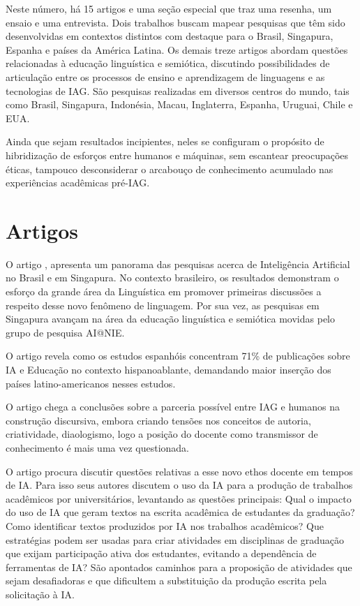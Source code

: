 \documentclass[portuguese]{textolivre}
\begin{document}
Neste número, há 15 artigos e uma seção especial que traz uma resenha, um ensaio e uma entrevista.  Dois trabalhos buscam mapear pesquisas que têm sido desenvolvidas em contextos distintos com destaque para o Brasil, Singapura, Espanha e países da América Latina. Os demais treze artigos abordam questões relacionadas à educação linguística e semiótica, discutindo possibilidades de articulação entre os processos de ensino e aprendizagem de linguagens e as tecnologias de IAG. São pesquisas realizadas em diversos centros do mundo, tais como Brasil, Singapura, Indonésia, Macau, Inglaterra, Espanha, Uruguai, Chile e EUA.

Ainda que sejam resultados incipientes, neles se configuram o propósito de hibridização de esforços entre humanos e máquinas, sem escantear preocupações éticas, tampouco desconsiderar o arcabouço de conhecimento acumulado nas experiências acadêmicas pré-IAG.

\section{Artigos}
  
O artigo , apresenta um panorama das pesquisas acerca de Inteligência Artificial no Brasil e em Singapura. No contexto brasileiro, os resultados demonstram o esforço da grande área da Linguística em promover primeiras discussões a respeito desse novo fenômeno de linguagem. Por sua vez, as pesquisas em Singapura avançam na área da educação linguística e semiótica movidas pelo grupo de pesquisa AI@NIE.

O artigo  revela como os estudos espanhóis concentram 71\% de publicações sobre IA e Educação no contexto hispanoablante, demandando maior inserção dos países latino-americanos nesses estudos.

O artigo  chega a conclusões sobre a parceria possível entre IAG e humanos na construção discursiva, embora criando tensões nos conceitos de autoria, criatividade, diaologismo, logo a posição do docente como transmissor de conhecimento é mais uma vez questionada. 

O artigo  procura discutir questões relativas a esse novo ethos docente em tempos de IA. Para isso seus autores discutem o uso da IA para a produção de trabalhos acadêmicos por universitários, levantando as questões principais: Qual o impacto do uso de IA que geram textos na escrita acadêmica de estudantes da graduação? Como identificar textos produzidos por IA nos trabalhos acadêmicos? Que estratégias podem ser usadas para criar atividades em disciplinas de graduação que exijam participação ativa dos estudantes, evitando a dependência de ferramentas de IA? São apontados caminhos para a proposição de atividades que sejam desafiadoras e que dificultem a substituição da produção escrita pela solicitação à IA.
\end{document}
